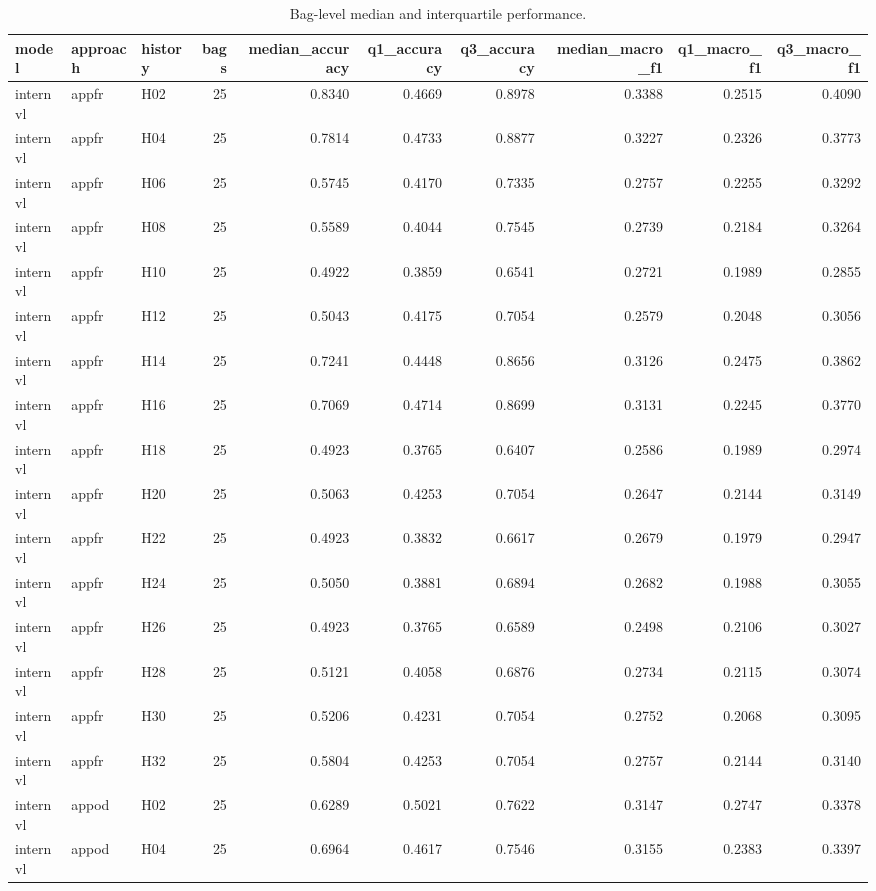 \begin{table}[tbp]
\caption{Bag-level median and interquartile performance.}
\label{tab:rq1_descriptive_bag_summary}
\begin{tabular}{lllrrrrrrr}
\toprule
model & approach & history & bags & median\_accuracy & q1\_accuracy & q3\_accuracy & median\_macro\_f1 & q1\_macro\_f1 & q3\_macro\_f1 \\
\midrule
internvl & appfr & H02 & 25 & 0.8340 & 0.4669 & 0.8978 & 0.3388 & 0.2515 & 0.4090 \\
internvl & appfr & H04 & 25 & 0.7814 & 0.4733 & 0.8877 & 0.3227 & 0.2326 & 0.3773 \\
internvl & appfr & H06 & 25 & 0.5745 & 0.4170 & 0.7335 & 0.2757 & 0.2255 & 0.3292 \\
internvl & appfr & H08 & 25 & 0.5589 & 0.4044 & 0.7545 & 0.2739 & 0.2184 & 0.3264 \\
internvl & appfr & H10 & 25 & 0.4922 & 0.3859 & 0.6541 & 0.2721 & 0.1989 & 0.2855 \\
internvl & appfr & H12 & 25 & 0.5043 & 0.4175 & 0.7054 & 0.2579 & 0.2048 & 0.3056 \\
internvl & appfr & H14 & 25 & 0.7241 & 0.4448 & 0.8656 & 0.3126 & 0.2475 & 0.3862 \\
internvl & appfr & H16 & 25 & 0.7069 & 0.4714 & 0.8699 & 0.3131 & 0.2245 & 0.3770 \\
internvl & appfr & H18 & 25 & 0.4923 & 0.3765 & 0.6407 & 0.2586 & 0.1989 & 0.2974 \\
internvl & appfr & H20 & 25 & 0.5063 & 0.4253 & 0.7054 & 0.2647 & 0.2144 & 0.3149 \\
internvl & appfr & H22 & 25 & 0.4923 & 0.3832 & 0.6617 & 0.2679 & 0.1979 & 0.2947 \\
internvl & appfr & H24 & 25 & 0.5050 & 0.3881 & 0.6894 & 0.2682 & 0.1988 & 0.3055 \\
internvl & appfr & H26 & 25 & 0.4923 & 0.3765 & 0.6589 & 0.2498 & 0.2106 & 0.3027 \\
internvl & appfr & H28 & 25 & 0.5121 & 0.4058 & 0.6876 & 0.2734 & 0.2115 & 0.3074 \\
internvl & appfr & H30 & 25 & 0.5206 & 0.4231 & 0.7054 & 0.2752 & 0.2068 & 0.3095 \\
internvl & appfr & H32 & 25 & 0.5804 & 0.4253 & 0.7054 & 0.2757 & 0.2144 & 0.3140 \\
internvl & appod & H02 & 25 & 0.6289 & 0.5021 & 0.7622 & 0.3147 & 0.2747 & 0.3378 \\
internvl & appod & H04 & 25 & 0.6964 & 0.4617 & 0.7546 & 0.3155 & 0.2383 & 0.3397 \\

\end{tabular}
\end{table}
